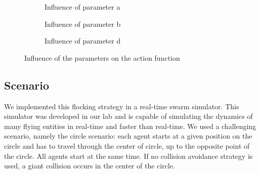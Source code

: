 \begin{figure}[h]
    \centering
    \begin{subfigure}[b]{0.5\textwidth}
		\setlength{\abovecaptionskip}{1pt plus 3pt minus 0pt}	
	    
	    \caption{Influence of parameter a}
	\end{subfigure}
	\begin{subfigure}[b]{0.5\textwidth}
		\setlength{\abovecaptionskip}{1pt plus 3pt minus 0pt}	
	    
	    \caption{Influence of parameter b}
	\end{subfigure}
	\begin{subfigure}[b]{0.5\textwidth}
	    \setlength{\abovecaptionskip}{1pt plus 3pt minus 0pt}
	    
	    \caption{Influence of parameter d}
	\end{subfigure}

    \caption{Influence of the parameters on the action function}
    \label{fig:effects_actionCurve}
\end{figure} 

\subsection{Scenario}

We implemented this flocking strategy in a real-time swarm simulator. This simulator was developed in our lab and is capable of simulating the dynamics of many flying entities in real-time and faster than real-time. We used a challenging scenario, namely the circle scenario: each agent starts at a given position on the circle and has to travel through the center of circle, up to the opposite point of the circle. All agents start at the same time. If no collision avoidance strategy is used, a giant collision occurs in the center of the circle. 
